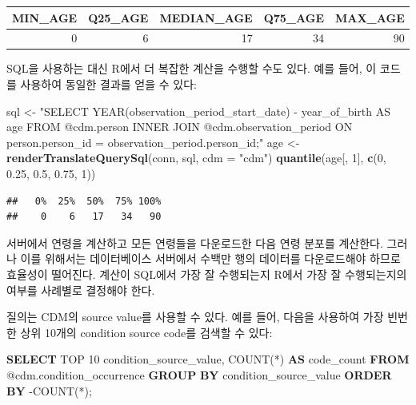 \documentclass[11pt]{book}
\newenvironment{Shaded}{\begin{snugshade}}{\end{snugshade}}
\newcommand{\KeywordTok}[1]{\textcolor[rgb]{0.13,0.29,0.53}{\textbf{#1}}}
\newcommand{\DataTypeTok}[1]{\textcolor[rgb]{0.13,0.29,0.53}{#1}}
\newcommand{\DecValTok}[1]{\textcolor[rgb]{0.00,0.00,0.81}{#1}}
\newcommand{\FloatTok}[1]{\textcolor[rgb]{0.00,0.00,0.81}{#1}}
\newcommand{\StringTok}[1]{\textcolor[rgb]{0.31,0.60,0.02}{#1}}
\newcommand{\FunctionTok}[1]{\textcolor[rgb]{0.00,0.00,0.00}{#1}}
\newcommand{\NormalTok}[1]{#1}
\theoremstyle{definition}
\theoremstyle{definition}
\theoremstyle{definition}
\theoremstyle{remark}
\begin{document}
\begin{longtable}[]{@{}rrrrr@{}}
\toprule
MIN\_AGE & Q25\_AGE & MEDIAN\_AGE & Q75\_AGE & MAX\_AGE\tabularnewline
\midrule
\endhead
0 & 6 & 17 & 34 & 90\tabularnewline
\bottomrule
\end{longtable}

SQL을 사용하는 대신 R에서 더 복잡한 계산을 수행할 수도 있다. 예를 들어,
이 코드를 사용하여 동일한 결과를 얻을 수 있다:

\begin{Shaded}
\begin{Highlighting}[]
\NormalTok{sql <-}\StringTok{ "SELECT YEAR(observation_period_start_date) -}
\StringTok{               year_of_birth AS age}
\StringTok{FROM @cdm.person}
\StringTok{INNER JOIN @cdm.observation_period}
\StringTok{  ON person.person_id = observation_period.person_id;"}
\NormalTok{age <-}\StringTok{ }\KeywordTok{renderTranslateQuerySql}\NormalTok{(conn, sql, }\DataTypeTok{cdm =} \StringTok{"cdm"}\NormalTok{)}
\KeywordTok{quantile}\NormalTok{(age[, }\DecValTok{1}\NormalTok{], }\KeywordTok{c}\NormalTok{(}\DecValTok{0}\NormalTok{, }\FloatTok{0.25}\NormalTok{, }\FloatTok{0.5}\NormalTok{, }\FloatTok{0.75}\NormalTok{, }\DecValTok{1}\NormalTok{))}
\end{Highlighting}
\end{Shaded}

\begin{verbatim}
##   0%  25%  50%  75% 100% 
##    0    6   17   34   90
\end{verbatim}

서버에서 연령을 계산하고 모든 연령들을 다운로드한 다음 연령 분포를
계산한다. 그러나 이를 위해서는 데이터베이스 서버에서 수백만 행의
데이터를 다운로드해야 하므로 효율성이 떨어진다. 계산이 SQL에서 가장 잘
수행되는지 R에서 가장 잘 수행되는지의 여부를 사례별로 결정해야 한다.

질의는 CDM의 source value를 사용할 수 있다. 예를 들어, 다음을 사용하여
가장 빈번한 상위 10개의 condition source code를 검색할 수 있다:

\begin{Shaded}
\begin{Highlighting}[]
\KeywordTok{SELECT}\NormalTok{ TOP }\DecValTok{10}\NormalTok{ condition_source_value, }
  \FunctionTok{COUNT}\NormalTok{(*) }\KeywordTok{AS}\NormalTok{ code_count}
\KeywordTok{FROM}\NormalTok{ @cdm.condition_occurrence}
\KeywordTok{GROUP} \KeywordTok{BY}\NormalTok{ condition_source_value}
\KeywordTok{ORDER} \KeywordTok{BY}\NormalTok{ -COUNT(*);}
\end{Highlighting}
\end{Shaded}
\end{document}
